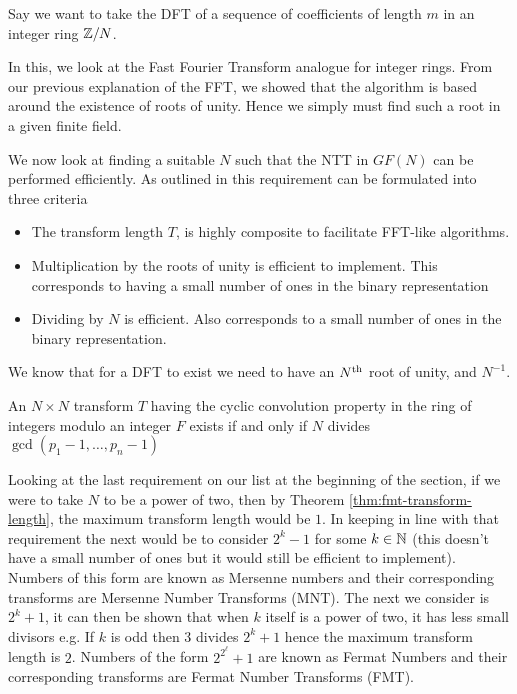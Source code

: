 Say we want to take the DFT of a sequence of coefficients of length $m$ in an integer ring ${\mathbb Z}/N$.

In this, we look at the Fast Fourier Transform analogue for integer rings. From our previous explanation of the FFT, we showed that the algorithm is based around the existence of roots of unity. Hence we simply must find such a root in a given finite field.

We now look at finding a suitable $N$ such that the NTT in $GF(N)$ can be performed efficiently. As outlined in \cite{intro-to-fmt} this requirement can be formulated into three criteria
\begin{itemize}
\item The transform length $T$, is highly composite to facilitate FFT-like algorithms.
\item Multiplication by the roots of unity is efficient to implement. This corresponds to having a small number of ones in the binary representation
\item Dividing by $N$ is efficient. Also corresponds to a small number of ones in the binary representation.
\end{itemize}

We know that for a DFT to exist we need to have an $N^{\textrm{th}}$ root of unity, and $N^{-1}$. 

\begin{theorem}\label{thm:fmt-transform-length}
    An $N \times N$ transform $T$ having the cyclic convolution property in the ring of integers modulo an integer $F$ exists if and only if $N$ divides $\gcd(p_1 - 1, \ldots, p_n - 1)$
\end{theorem}

Looking at the last requirement on our list at the beginning of the section, if we were to take $N$ to be a power of two, then by Theorem \ref{thm:fmt-transform-length}, the maximum transform length would be $1$. In keeping in line with that requirement the next would be to consider $2^k - 1$  for some $k \in {\mathbb N}$ (this doesn't have a small number of ones but it would still be efficient to implement). Numbers of this form are known as Mersenne numbers and their corresponding transforms are Mersenne Number Transforms (MNT). The next we consider is $2^k + 1$, it can then be shown that when $k$ itself is a power of two, it has less small divisors e.g. If $k$ is odd then $3$ divides $2^k + 1$ hence the maximum transform length is $2$. Numbers of the form $2^{2^\ell} + 1$ are known as Fermat Numbers and their corresponding transforms are Fermat Number Transforms (FMT).

